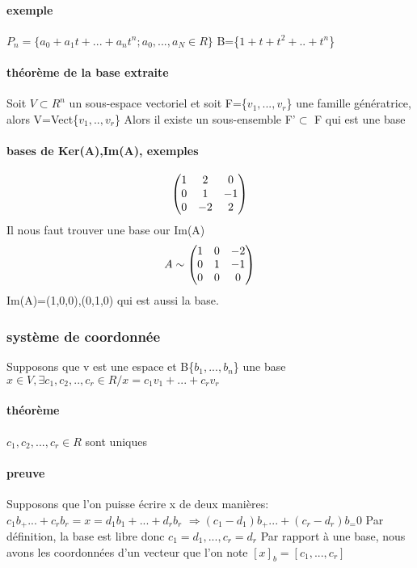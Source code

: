 \documentclass[a4paper,10pt]{article}
\begin{document}
\paragraph{exemple}
$P_n=\{a_0+a_1t+...+a_nt^n;a_0,...,a_N\in R\}$
\newline
B=\{$1+t+t^2+..+t^n$\}
\paragraph{théorème de la base extraite}
Soit $V\subset R^n$ un sous-espace vectoriel et soit F=\{$v_1,...,v_r$\} une famille génératrice, alors V=Vect\{$v_1,..,v_r$\}
\newline
Alors il existe un sous-ensemble F'$\subset$ F qui est une base
\paragraph{bases de Ker(A),Im(A), exemples}
\[
\begin{pmatrix}
1&2&0\cr
0&1&-1\cr
0&-2&2\cr
\end{pmatrix}
\]
\newline
Il nous faut trouver une base our Im(A)
\[
A\sim
\begin{pmatrix}
1&0&-2\cr
0&1&-1\cr
0&0&0\cr
\end{pmatrix}
\]
\newline
Im(A)=(1,0,0),(0,1,0) qui est aussi la base.
\subsubsection{système de coordonnée}
Supposons que v est une espace et B\{$b_1,...,b_n$\} une base
\newline
$x\in V,\exists c_1,c_2,..,c_r\in R/x=c_1v_1+...+c_rv_r$
\paragraph{théorème}
$c_1,c_2,...,c_r\in R $ sont uniques
\paragraph{preuve}
Supposons que l'on puisse écrire x de deux manières:$c_1b_+...+c_rb_r=x=d_1b_1+...+d_rb_r$
\newline
$\Rightarrow (c_1-d_1)b_+...+(c_r-d_r)b_=0$
\newline
Par définition, la base est libre donc $c_1=d_1,...,c_r=d_r$
\newline
Par rapport à une base, nous avons les coordonnées d'un vecteur que l'on note $[x]_b=[c_1,...,c_r]$
\end{document}
